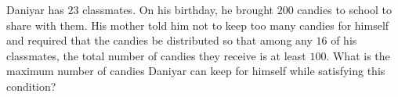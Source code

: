 Daniyar has $23$ classmates. On his birthday, he brought $200$ candies to school to share with them. His mother told him not to keep too many candies for himself and required that the candies be distributed so that among any $16$ of his classmates, the total number of candies they receive is at least $100$. What is the maximum number of candies Daniyar can keep for himself while satisfying this condition?
